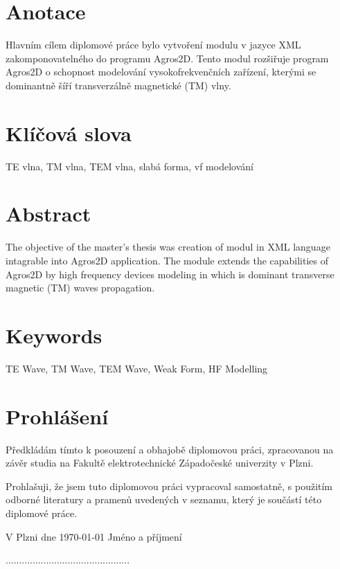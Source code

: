 \documentclass[12pt,a4paper,oneside]{article}
\numberwithin{equation}{section} %
\numberwithin{figure}{section} %
\numberwithin{table}{section} %
\begin{document}
\section*{Anotace}
Hlavním cílem diplomové práce bylo vytvoření modulu v jazyce XML zakomponovatelného do programu Agros2D. Tento modul rozšiřuje program Agros2D o schopnost modelování vysokofrekvenčních zařízení, kterými se dominantně šíří transverzálně magnetické (TM) vlny.
\vspace{100mm}\\

\section*{Klíčová slova}
TE vlna, TM vlna, TEM vlna, slabá forma, vf modelování
\newpage


\section*{Abstract}
The objective of the master's thesis was creation of modul in XML language intagrable into Agros2D application. The module extends the capabilities of Agros2D by high frequency devices modeling in which is dominant transverse magnetic (TM) waves propagation. 
\vspace{100mm}\\

\section*{Keywords}
TE Wave, TM Wave, TEM Wave, Weak Form, HF Modelling
\newpage


\vspace*{50mm}
\section*{Prohlášení}
Předkládám tímto k posouzení a obhajobě diplomovou práci, zpracovanou na závěr 			studia na Fakultě elektrotechnické Západočeské univerzity v Plzni.

Prohlašuji, že jsem tuto diplomovou práci vypracoval samostatně, s použitím odborné 	literatury a pramenů uvedených v seznamu, který je součástí této diplomové práce.
\vspace{\fill}
\begin{flushleft}
V Plzni dne \today
\hspace{\fill}
Jméno a příjmení~~~~~~~~\vspace{3mm}
\end{flushleft}
\begin{flushright}
..............................................
\end{flushright}
\newpage
\end{document}
